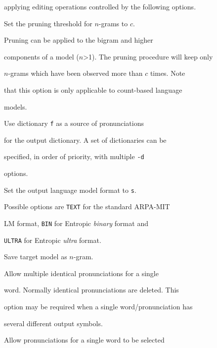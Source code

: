 applying editing operations controlled by the following options.


\begin{optlist}





   Set the pruning threshold for $n$-grams to $c$. 


	Pruning can be applied to the bigram and higher


	components of a model ($n$>1). The pruning procedure will keep only 


	$n$-grams which have been observed more than $c$ times. Note


	that this option is only applicable to count-based language 


        models.





   Use dictionary {\tt f} as a source of pronunciations


        for the output dictionary. A set of dictionaries can be


        specified, in order of priority, with multiple {\tt -d}


        options.


  


   Set the output language model format to {\tt s}.


        Possible options are {\tt TEXT} for the standard ARPA-MIT


	LM format, {\tt BIN} for Entropic {\em binary} format and 


        {\tt ULTRA} for Entropic {\em ultra} format.


        


   Save target model as $n$-gram.





   Allow multiple identical pronunciations for a single


	word.  Normally identical pronunciations are deleted.  This


	option may be required when a single word/pronunciation has


	several different output symbols.





   Allow pronunciations for a single word to be selected



\end{optlist}
